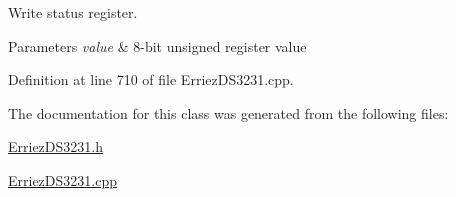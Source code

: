 Write status register. 


\begin{DoxyParams}{Parameters}
{\em value} & 8-\/bit unsigned register value \\
\hline
\end{DoxyParams}


Definition at line 710 of file Erriez\+D\+S3231.\+cpp.



The documentation for this class was generated from the following files\+:\begin{DoxyCompactItemize}
\item 
\hyperlink{_erriez_d_s3231_8h}{Erriez\+D\+S3231.\+h}\item 
\hyperlink{_erriez_d_s3231_8cpp}{Erriez\+D\+S3231.\+cpp}\end{DoxyCompactItemize}
